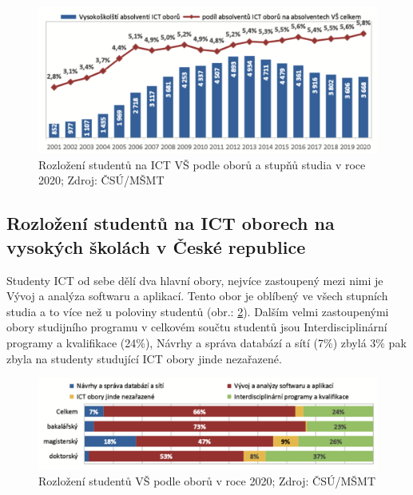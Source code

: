 \documentclass[12pt]{report}			%
\begin{document}
            \begin{figure}[h]
                \centering
                \includegraphics[width=16cm]{Maturitni Prace/images/absolventi_VS.png}
                \caption[Rozložení studentů na ICT VŠ podle oborů a stupňů studia 2013/20]{Rozložení studentů na ICT VŠ podle oborů a stupňů studia v roce 2020; Zdroj: ČSÚ/MŠMT} 
                \label{fig:absolventi_VS}
            \end{figure}
            
            \subsection{Rozložení studentů na ICT oborech na vysokých školách v České republice}
                    
                Studenty ICT od sebe dělí dva hlavní obory, nejvíce zastoupený mezi nimi je Vývoj a analýza softwaru a aplikací. Tento obor je oblíbený ve všech stupních studia a to více než u poloviny studentů (obr.: \ref{fig:studijni_obor_VS}). Dalším velmi zastoupenými obory studijního programu v celkovém součtu studentů jsou Interdisciplinární programy a kvalifikace (24\%), Návrhy a správa databází a sítí (7\%) zbylá 3\% pak zbyla na studenty studující ICT obory jinde nezařazené. \cite{LidskeZdrojeVIT}
                
                \begin{figure}[h]
                    \centering
                    \includegraphics[width=16cm]{Maturitni Prace/images/studijni_obor_VS.png}
                    \caption[Rozložení studentů VŠ podle oborů v roce 2020]{Rozložení studentů VŠ podle oborů v roce 2020; Zdroj: ČSÚ/MŠMT}
                    \label{fig:studijni_obor_VS}
                \end{figure}
                
\end{document}

